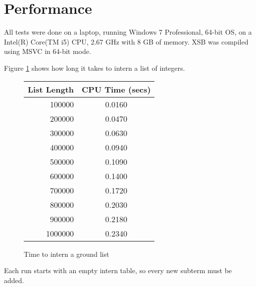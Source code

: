 \documentclass{llncs}
\begin{document}
\section{Performance}

All tests were done on a laptop, running Windows 7 Professional,
64-bit OS, on a Intel(R) Core(TM i5) CPU, 2.67 GHz with 8 GB of
memory.  XSB was compiled using MSVC in 64-bit mode.

Figure \ref{intern-time-table} shows how long it takes to intern a
list of integers.
\begin{figure}
\begin{center}
\begin{tabular}{|r|c|}
\hline
List Length &    CPU Time (secs) \\ \hline
 100000     &     0.0160 \\
 200000     &     0.0470 \\
 300000     &     0.0630 \\
 400000     &     0.0940 \\
 500000     &     0.1090 \\
 600000     &     0.1400 \\
 700000     &     0.1720 \\
 800000     &     0.2030 \\
 900000     &     0.2180 \\
1000000     &     0.2340 \\ \hline
\end{tabular}
\caption{Time to intern a ground list}\label{intern-time-table}
\end{center}
\end{figure}
Each run starts with an empty intern table, so every new subterm must
be added.
\end{document}
